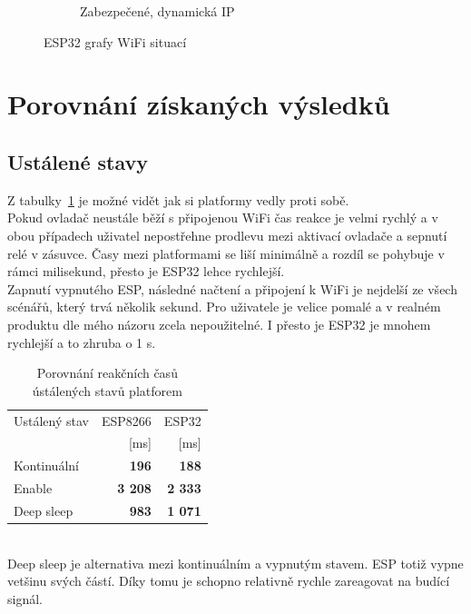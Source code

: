 \documentclass[a4paper, 12pt]{report}
\begin{document}
\begin{figure}[!ht]
\begin{subfigure}[b]{0.55\linewidth}
        \caption{Zabezpečené, dynamická IP}
    \end{subfigure}
    \caption{ESP32 grafy WiFi situací}
    \label{fig:esp32_network}
\end{figure}
    \newpage

    \section{Porovnání získaných výsledků}

    \subsection{Ustálené stavy}
    Z tabulky~\ref{tab:porovnani-klidove-rezimy-cas} je možné vidět jak si platformy vedly proti sobě. \\
    Pokud ovladač neustále běží s připojenou WiFi čas reakce je velmi rychlý a v obou případech uživatel nepostřehne prodlevu mezi aktivací ovladače a sepnutí relé v zásuvce.
    Časy mezi platformami se liší minimálně a rozdíl se pohybuje v rámci milisekund, přesto je ESP32 lehce rychlejší. \\
    Zapnutí vypnutého ESP, následné načtení a připojení k WiFi je nejdelší ze všech scénářů, který trvá několik sekund.
    Pro uživatele je velice pomalé a v realném produktu dle mého názoru zcela nepoužitelné.
    I přesto je ESP32 je mnohem rychlejší a to zhruba o 1 \si{s}.
    \begin{table}[h!]
        \centering
        \caption{Porovnání reakčních časů ústálených stavů platforem}
        \begin{tabular}{||l|r r||}
            \hline
            Ustálený stav & ESP8266        & ESP32          \\
            & [ms]           & [ms]           \\
            \hline
            Kontinuální   & \textbf{196}   & \textbf{188}   \\
            Enable        & \textbf{3 208} & \textbf{2 333} \\
            Deep sleep    & \textbf{983}   & \textbf{1 071} \\
            \hline
        \end{tabular}
        \label{tab:porovnani-klidove-rezimy-cas}
    \end{table}\\
    Deep sleep je alternativa mezi kontinuálním a vypnutým stavem.
    ESP totiž vypne vetšinu svých částí.
    Díky tomu je schopno relativně rychle zareagovat na budící signál.
\end{document}
